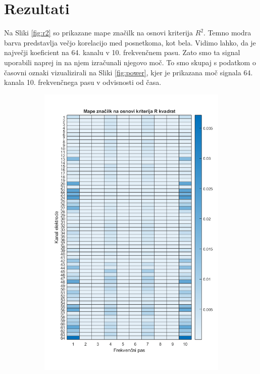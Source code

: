 \documentclass{article}
\begin{document}
\section{Rezultati}
\label{sec:results}

Na Sliki \ref{fig:r2} so prikazane mape značilk na osnovi kriterija $R^2$. Temno modra barva predstavlja večjo korelacijo med posnetkoma, kot bela. Vidimo lahko, da je največji koeficient na 64. kanalu v 10. frekvenčnem pasu. Zato smo ta signal uporabili naprej in na njem izračunali njegovo moč. To smo skupaj s podatkom o časovni oznaki vizualizirali na Sliki \ref{fig:power}, kjer je prikazana moč signala 64. kanala 10. frekvenčnega pasu v odvisnosti od časa.


\begin{figure}[H]
    \begin{subfigure}{0.49\linewidth}
        \centering
        \includegraphics[width=\textwidth]{r2.png}

\end{subfigure}
\end{figure}
\end{document}
